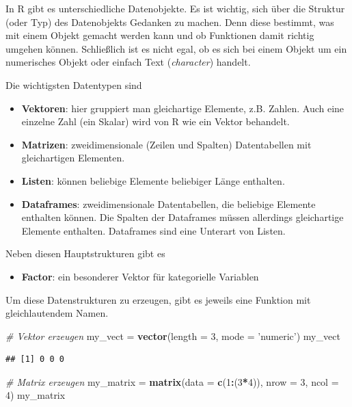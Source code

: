 \documentclass[]{book}
\newenvironment{Shaded}{\begin{snugshade}}{\end{snugshade}}
\newcommand{\CommentTok}[1]{\textcolor[rgb]{0.56,0.35,0.01}{\textit{#1}}}
\newcommand{\DataTypeTok}[1]{\textcolor[rgb]{0.13,0.29,0.53}{#1}}
\newcommand{\DecValTok}[1]{\textcolor[rgb]{0.00,0.00,0.81}{#1}}
\newcommand{\KeywordTok}[1]{\textcolor[rgb]{0.13,0.29,0.53}{\textbf{#1}}}
\newcommand{\NormalTok}[1]{#1}
\newcommand{\OperatorTok}[1]{\textcolor[rgb]{0.81,0.36,0.00}{\textbf{#1}}}
\newcommand{\StringTok}[1]{\textcolor[rgb]{0.31,0.60,0.02}{#1}}
\providecommand{\tightlist}{%
  \setlength{\itemsep}{0pt}\setlength{\parskip}{0pt}}
\begin{document}
In R gibt es unterschiedliche Datenobjekte. Es ist wichtig, sich über die Struktur (oder Typ) des Datenobjekts Gedanken zu machen. Denn diese bestimmt, was mit einem Objekt gemacht werden kann und ob Funktionen damit richtig umgehen können. Schließlich ist es nicht egal, ob es sich bei einem Objekt um ein numerisches Objekt oder einfach Text (\emph{character}) handelt.

Die wichtigsten Datentypen sind

\begin{itemize}
\tightlist
\item
  \textbf{Vektoren}: hier gruppiert man gleichartige Elemente, z.B. Zahlen. Auch eine einzelne Zahl (ein Skalar) wird von R wie ein Vektor behandelt.
\item
  \textbf{Matrizen}: zweidimensionale (Zeilen und Spalten) Datentabellen mit gleichartigen Elementen.
\item
  \textbf{Listen}: können beliebige Elemente beliebiger Länge enthalten.
\item
  \textbf{Dataframes}: zweidimensionale Datentabellen, die beliebige Elemente enthalten können. Die Spalten der Dataframes müssen allerdings gleichartige Elemente enthalten. Dataframes sind eine Unterart von Listen.
\end{itemize}

Neben diesen Hauptstrukturen gibt es

\begin{itemize}
\tightlist
\item
  \textbf{Factor}: ein besonderer Vektor für kategorielle Variablen
\end{itemize}

Um diese Datenstrukturen zu erzeugen, gibt es jeweils eine Funktion mit gleichlautendem Namen.

\begin{Shaded}
\begin{Highlighting}[]
\CommentTok{# Vektor erzeugen}
\NormalTok{my_vect =}\StringTok{ }\KeywordTok{vector}\NormalTok{(}\DataTypeTok{length =} \DecValTok{3}\NormalTok{, }\DataTypeTok{mode =} \StringTok{'numeric'}\NormalTok{)}
\NormalTok{my_vect}
\end{Highlighting}
\end{Shaded}

\begin{verbatim}
## [1] 0 0 0
\end{verbatim}

\begin{Shaded}
\begin{Highlighting}[]
\CommentTok{# Matrix erzeugen}
\NormalTok{my_matrix =}\StringTok{ }\KeywordTok{matrix}\NormalTok{(}\DataTypeTok{data =} \KeywordTok{c}\NormalTok{(}\DecValTok{1}\OperatorTok{:}\NormalTok{(}\DecValTok{3}\OperatorTok{*}\DecValTok{4}\NormalTok{)), }\DataTypeTok{nrow =} \DecValTok{3}\NormalTok{, }\DataTypeTok{ncol =} \DecValTok{4}\NormalTok{)}
\NormalTok{my_matrix}
\end{Highlighting}
\end{Shaded}
\end{document}
